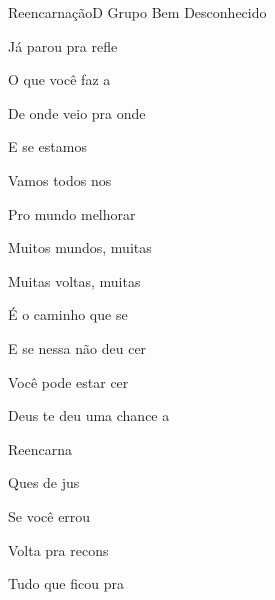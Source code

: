 \documentclass[a4,12pt,oneside]{book}
\newcommand{\RevDate}{\today}
\newcommand{\NotCCLIed}{\relax}
\begin{document}
\begin{song}{Reencarnação}{D}
  {Grupo Bem}
  {Desconhecido}
  {}
  {\NotCCLIed}
  
	\renewcommand{\RevDate}{10 de setembro de 2016}

	
	\ifChordBk
		{\vspace{-2em}\flushright{\Bmchord \quad \Gchord \quad \Achord\\}}
		\vspace{-1em}
	\fi
	
	
	\begin{SBVerse*}
		Já parou pra refle
		
		O que você faz a

		De onde veio pra onde 

		E se estamos 

		Vamos todos nos 

		Pro mundo melhorar 

		Muitos mundos, muitas 

		Muitas voltas, muitas 

		É o caminho que se 

		E se nessa não deu cer

		Você pode estar cer

		Deus te deu uma chance a 
	\end{SBVerse*}
	
	\vspace{-3ex}
	
	\begin{SBChorus}
		 Reencarna

		 Ques de jus

		 Se você errou 

		 Volta pra recons

		 Tudo que ficou pra 		
	\end{SBChorus}
\end{song} 
\end{document}
